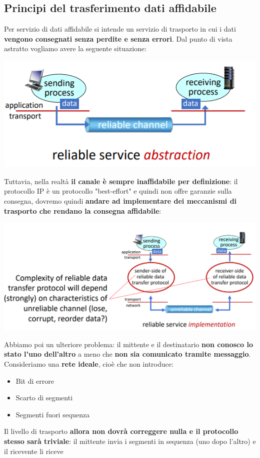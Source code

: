 \documentclass[12pt]{article}
\begin{document}
\subsection{Principi del trasferimento dati affidabile}
Per servizio di dati affidabile si intende un servizio di trasporto in cui i dati \textbf{vengono consegnati senza perdite e senza errori}.
Dal punto di vista astratto vogliamo avere la seguente situazione:
\begin{center}
    \includegraphics[width = 0.70\linewidth]{Images/44.png}
\end{center}
Tuttavia, nella realtà \textbf{il canale è sempre inaffidabile per definizione}: il protocollo IP è un protocollo "best-effort" e quindi non offre
garanzie sulla consegna, dovremo quindi \textbf{andare ad implementare dei meccanismi di trasporto che rendano la consegna affidabile}:
\begin{center}
    \includegraphics[width = 1\linewidth]{Images/45.png}
\end{center}
Abbiamo poi un ulteriore problema: il mittente e il destinatario \textbf{non conosco lo stato l'uno dell'altro} a meno che \textbf{non sia comunicato tramite messaggio}.
Consideriamo una \textbf{rete ideale}, cioè che non introduce:
\begin{itemize}
    \item Bit di errore
    \item Scarto di segmenti
    \item Segmenti fuori sequenza
\end{itemize}
Il livello di trasporto \textbf{allora non dovrà correggere nulla e il protocollo stesso sarà triviale}: il mittente invia i segmenti in sequenza (uno dopo l'altro) e il ricevente li riceve
\end{document}
